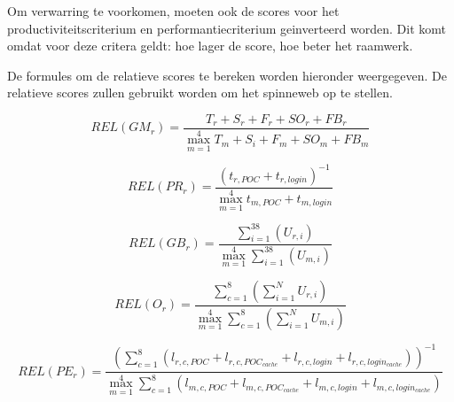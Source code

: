Om verwarring te voorkomen, moeten ook de scores voor het productiviteitscriterium en performantiecriterium geinverteerd worden.
Dit komt omdat voor deze critera geldt:  hoe lager de score,  hoe beter het raamwerk.

De formules om de relatieve scores te bereken worden hieronder weergegeven.
De relatieve scores zullen gebruikt worden om het spinneweb op te stellen.

\begin{equation}
  REL(GM_r)=\frac{T_r+S_r+F_r+SO_r+FB_r}{\max_{m=1}^{4}{T_m+S_i+F_m+SO_m+FB_m}}
  \label{eq:rel-populariteit}
\end{equation}

\begin{equation}
  REL(PR_r) = \frac{\left({t_{r,POC} + t_{r,login}}\right)^{-1}}{\max_{m=1}^{4}{t_{m,POC} + t_{m,login}}}
  \label{eq:rel-productiviteit}
\end{equation}

\begin{equation}
  REL(GB_r) = \frac{\sum_{i=1}^{38}{\left(U_{r,i}\right)}}{\max_{m=1}^{4}{\sum_{i=1}^{38}{\left(U_{m,i}\right)}}}
  \label{eq:rel-gebruik}
\end{equation}

\begin{equation}
  REL(O_r) = \frac{\sum_{c=1}^{8}{\left(\sum_{i=1}^{N}U_{r,i}\right)}}{\max_{m=1}^{4}{\sum_{c=1}^{8}{\left(\sum_{i=1}^{N}U_{m,i}\right)}}}
  \label{eq:rel-ondersteuning}
\end{equation}

\begin{equation}
  REL(PE_r)= \frac{\left(\sum_{c=1}^{8}{\left(l_{r,c,POC}+l_{r,c,POC_{cache}}+l_{r,c,login}+l_{r,c,login_{cache}}\right)}\right)^{-1}}{\max_{m=1}^{4}{\sum_{c=1}^{8}{\left(l_{m,c,POC}+l_{m,c,POC_{cache}}+l_{m,c,login}+l_{m,c,login_{cache}}\right)}}}
  \label{eq:rel-performantie}
\end{equation}
